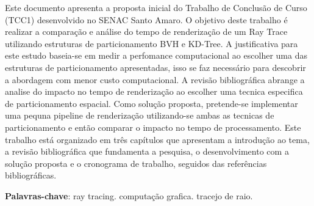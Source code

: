 \documentclass[
    12pt,                %
    openright,           %
    oneside,             %
    a4paper,             %
    english,             %
    brazil               %
]{abntex2}
\begin{document}

\frenchspacing

\pretextual

\imprimircapa

\imprimirfolhaderosto

\begin{resumo}
Este documento apresenta a proposta inicial do Trabalho de Conclusão de Curso (TCC1) desenvolvido no SENAC Santo Amaro. O objetivo deste trabalho é realizar a comparação e análise do tempo de renderização de um Ray Trace utilizando estruturas de particionamento BVH e KD-Tree. A justificativa para este estudo baseia-se em medir a perfomance computacional ao escolher uma das estruturas de particionamento apresentadas, isso se faz necessário para descobrir a abordagem com menor custo computacional. A revisão bibliográfica abrange a analise do impacto no tempo de renderização ao escolher uma tecnica especifica de particionamento espacial. Como solução proposta, pretende-se implementar uma pequna pipeline de renderização utilizando-se ambas as tecnicas de particionamento e então comparar o impacto no tempo de processamento. Este trabalho está organizado em três capítulos que apresentam a introdução ao tema, a revisão bibliográfica que fundamenta a pesquisa, o desenvolvimento com a solução proposta e o cronograma de trabalho, seguidos das referências bibliográficas.

\vspace{\onelineskip}

\noindent
\textbf{Palavras-chave}: ray tracing. computação grafica. tracejo de raio.
\end{resumo}

\end{document}

